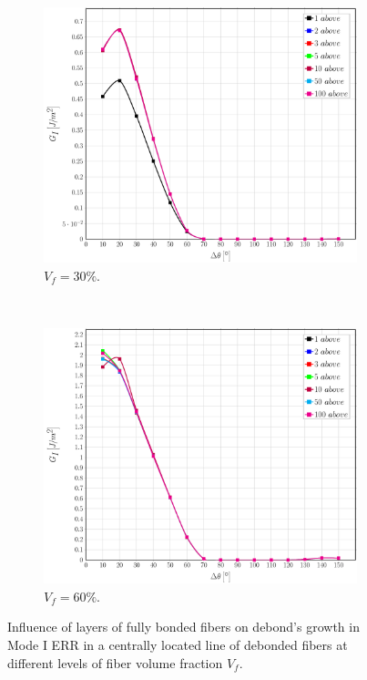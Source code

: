 \documentclass[review]{elsarticle}
\begin{document}
\begin{figure}[!h]
\centering
    \begin{subfigure}[b]{0.45\textwidth}
        \includegraphics[width=\textwidth]{abovefibers-vf30-GI.pdf}
        \caption{$V_{f}=30\%$.}\label{subfig:sidefiber30MI}
    \end{subfigure} ~
    \begin{subfigure}[b]{0.45\textwidth}
        \includegraphics[width=\textwidth]{abovefibers-vf60-GI.pdf}
        \caption{$V_{f}=60\%$.}\label{subfig:sidefiber60MI}
    \end{subfigure}

\caption{Influence of layers of fully bonded fibers on debond's growth in Mode I ERR in a centrally located line of debonded fibers at different levels of fiber volume fraction $V_{f}$.}\label{fig:abovefibersMI}
\end{figure}
\end{document}
